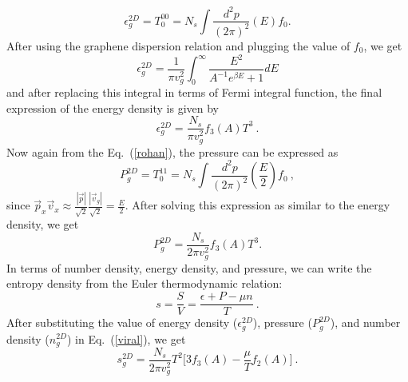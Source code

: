 \documentclass[amsmath,amssymb,aps,prb]{revtex4-2}
\begin{document}
    \begin{equation}
    \epsilon_g^{2D} = T_0^{0 0} =  N_s \int \frac{d^2 p}{\left(2\pi\right)^2}\left(E \right) f_0.
    \end{equation}
%
    After using the graphene dispersion relation and plugging the value of $f_0$, we get
    \begin{equation}
    \epsilon_g^{2D} = \frac{1}{\pi v_g^2} \int_{0}^{\infty}  \frac{E^2}{A^{-1}e^{\beta E} + 1} dE
    \end{equation}
    and after replacing this integral in terms of Fermi integral function, the final expression of the energy density is given by
    \begin{equation}
    \epsilon_g^{2D} = \frac{N_s}{\pi v_g^2} f_3\left(A\right) T^3~.
    \end{equation}
    Now again from the Eq.~(\ref{rohan}), the pressure can be expressed as 
    \begin{equation}
    P_g^{2D} = T_0^{11} = N_s \int \frac{d^2 p}{\left(2\pi\right)^2}\left(\frac{E}{2} \right) f_0~,
    \end{equation}
    since $\vec{p}_x \vec{v}_x \approx \frac{|\vec{p}|}{\sqrt{2}} \frac{|\vec{v}_g|}{\sqrt{2}}=\frac{E}{2}$.
    After solving this expression as similar to the energy density, we get
    \begin{equation}
    P_g^{2D} = \frac{N_s}{2 \pi v_g^2} f_3\left(A\right) T^3.
    \end{equation}
%
    In terms of number density, energy density, and pressure, we can write the entropy density from the Euler thermodynamic relation:
    \begin{equation}
    s = \frac{S}{V} = \frac{\epsilon + P - \mu n}{T}~.
    \label{viral}
    \end{equation}
%
    After substituting the value of energy density ($\epsilon_g^{2D}$), pressure ($P_g^{2D}$), and number density ($ n_g^{2D}$) in Eq.~(\ref{viral}), we get
    \begin{equation}
    s_g^{2D} = \frac{N_s}{2 \pi v_g^2} T^2 \Big[3f_3\left(A\right) - \frac{\mu}{T} f_2\left(A\right) \Big]~.
    \label{pure}
    \end{equation}
%
%
\end{document}
